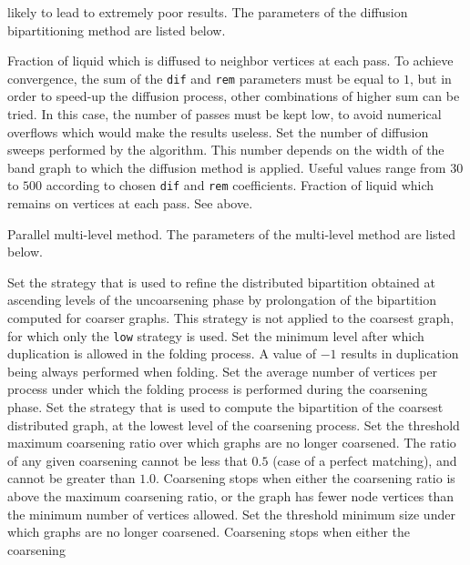 \begin{itemize}
\begin{itemize}
likely to lead to extremely poor results.  The parameters of the
diffusion bipartitioning method are listed below.
\begin{itemize}
\iteme[{\tt dif=}{\it rat}]
Fraction of liquid which is diffused to neighbor vertices at each
pass. To achieve convergence, the sum of the {\tt dif} and {\tt rem}
parameters must be equal to $1$, but in order to speed-up the diffusion
process, other combinations of higher sum can be tried. In this case,
the number of passes must be kept low, to avoid numerical overflows
which would make the results useless.
\iteme[{\tt pass=}{\it nbr}]
Set the number of diffusion sweeps performed by the algorithm. This
number depends on the width of the band graph to which the diffusion
method is applied. Useful values range from $30$ to $500$ according
to chosen {\tt dif} and {\tt rem} coefficients.
\iteme[{\tt rem=}{\it rat}]
Fraction of liquid which remains on vertices at each pass. See above.
\end{itemize}
\iteme[{\tt m}]
Parallel multi-level method. The parameters of the multi-level method
are listed below.
\begin{itemize}
\iteme[{\tt asc=}{\it strat}]
Set the strategy that is used to refine the distributed bipartition
obtained at ascending levels of the uncoarsening phase by
prolongation of the bipartition computed for coarser graphs.
This strategy is not applied to the coarsest graph,
for which only the {\tt low} strategy is used.
\iteme[{\tt dlevl=}{\it nbr}]
Set the minimum level after which duplication is allowed in the
folding process. A value of $-1$ results in duplication being always
performed when folding.
\iteme[{\tt dvert=}{\it nbr}]
Set the average number of vertices per process under which
the folding process is performed during the coarsening phase.
\iteme[{\tt low=}{\it strat}]
Set the strategy that is used to compute the bipartition of the
coarsest distributed graph,
at the lowest level of the coarsening process.
\iteme[{\tt rat=}{\it rat}]
Set the threshold maximum coarsening ratio over which graphs
are no longer coarsened. The ratio of any given coarsening cannot be
less that $0.5$ (case of a perfect matching), and cannot be greater
than $1.0$. Coarsening stops when either the coarsening ratio is
above the maximum coarsening ratio, or the graph
has fewer node vertices than the minimum number of vertices allowed.
\iteme[{\tt vert=}{\it nbr}]
Set the threshold minimum size under which graphs
are no longer coarsened. Coarsening stops when either the coarsening

\end{itemize}
\end{itemize}
\end{itemize}
